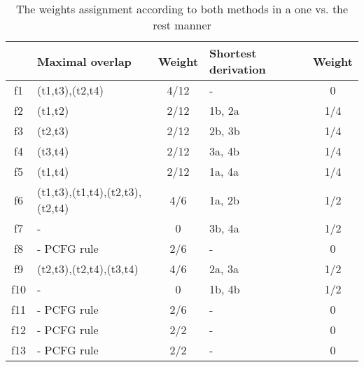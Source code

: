 \begin{table}[h!]
\center
\begin{tabular}{c|p{}c|p{}c|}
&Maximal overlap&Weight&Shortest derivation\footnotemark&Weight\\\hline
f1&(t1,t3),(t2,t4)&4/12&-&0\\
f2&(t1,t2)&2/12&1b, 2a&1/4\\
f3&(t2,t3)&2/12&2b, 3b&1/4\\
f4&(t3,t4)&2/12&3a, 4b&1/4\\
f5&(t1,t4)&2/12&1a, 4a&1/4\\
f6&(t1,t3),(t1,t4),(t2,t3),(t2,t4)&4/6&1a, 2b&1/2\\
f7&-&0&3b, 4a&1/2\\
f8&- PCFG rule&2/6&-&0\\
f9&(t2,t3),(t2,t4),(t3,t4)&4/6&2a, 3a&1/2\\
f10&-&0&1b, 4b&1/2\\
f11&-  PCFG rule&2/6&-&0\\
f12&- PCFG rule&2/2&-&0\\
f13&- PCFG rule&2/2&-&0\\
\end{tabular}
\caption{The weights assignment according to both methods in a one vs. the rest manner}
\label{t:weights}
\end{table}




























